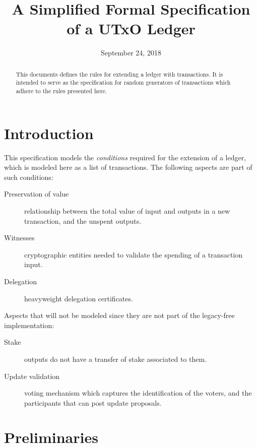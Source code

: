 \documentclass[11pt,a4paper]{article}
\begin{document}
\title{A Simplified Formal Specification of a UTxO Ledger}

\author{}

\date{September 24, 2018}

\maketitle

\begin{abstract}
This documents defines the rules for extending a ledger with transactions. It
is intended to serve as the specification for random generators of transactions
which adhere to the rules presented here.
\end{abstract}

\tableofcontents
\listoffigures

\section{Introduction}
\label{sec:introduction}

This specification models the \textit{conditions} required for the extension of
a ledger, which is modeled here as a list of transactions. The following
aspects are part of such conditions:

\begin{description}
\item[Preservation of value] relationship between the total value of input and outputs
  in a new transaction, and the unspent outputs.
\item[Witnesses] cryptographic entities needed to validate the spending
  of a transaction input.
\item[Delegation] heavyweight delegation certificates.
\end{description}

Aspects that will not be modeled since they are not part of the legacy-free
implementation:
\begin{description}
\item[Stake] outputs do not have a transfer of stake associated to them.
\item[Update validation] voting mechanism which captures the identification of
  the voters, and the participants that can post update proposals.
\end{description}
\section{Preliminaries}\label{sec:preliminaries}
\end{document}

